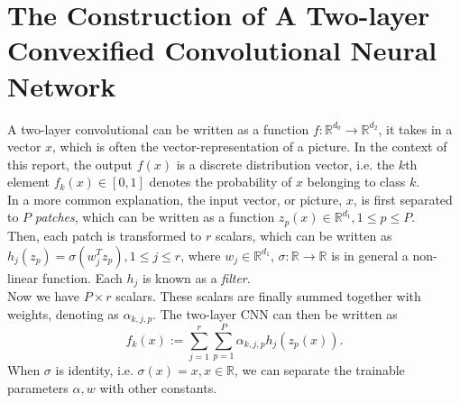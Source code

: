 \documentclass{article}
\begin{document}
\section{The Construction of A Two-layer Convexified Convolutional Neural Network}
A two-layer convolutional can be written as a function $f:\mathbb{R}^{d_0}\rightarrow\mathbb{R}^{d_2}$, it takes in a vector $x$, which is often the vector-representation of a picture. In the context of this report, the output $f(x)$ is a discrete distribution vector, i.e. the $k$th element $f_k(x)\in\left[0,1\right] $ denotes the probability of $x$ belonging to class $k$.\\
In a more common explanation, the input vector, or picture, $x$, is first separated to $P$ \emph{patches}, which can be written as a function $z_p(x)\in\mathbb{R}^{d_1},1\leq p\leq P$.\\
Then, each patch is transformed to $r$ scalars, which can be written as $h_j(z_p)=\sigma(w_j^Tz_p),1\leq j\leq r$, where $w_j\in\mathbb{R}^{d_1}$, $\sigma:\mathbb{R}\rightarrow\mathbb{R}$ is in general a non-linear function. Each $h_j$ is known as a \emph{filter}.\\
Now we have $P\times r$ scalars. These scalars are finally summed together with weights, denoting as $\alpha_{k,j,p}$. The two-layer CNN can then be written as
\[f_k(x):=\sum_{j=1}^{r}\sum_{p=1}^{P}\alpha_{k,j,p}h_j(z_p(x)).\]
When $\sigma$ is identity, i.e. $\sigma(x)=x,x\in\mathbb{R}$, we can separate the trainable parameters $\alpha,w$ with other constants.
\end{document}
